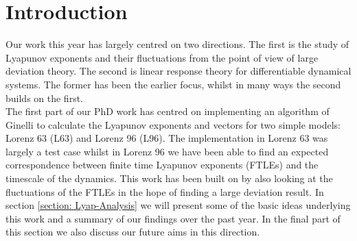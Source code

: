 \section{Introduction}

Our work this year has largely centred on two directions. The first is the study of Lyapunov exponents and their fluctuations from the point of view of large deviation theory. The second is linear response theory for differentiable dynamical systems. The former has been the earlier focus, whilst in many ways the second builds on the first.\\

The first part of our PhD work has centred on implementing an algorithm of Ginelli \cite{Ginelli2013} to calculate the Lyapunov exponents and vectors for two simple models: Lorenz 63 (L63) and Lorenz 96 (L96). The implementation in Lorenz 63 was largely a test case whilst in Lorenz 96 we have been able to find an expected correspondence between finite time Lyapunov exponents (FTLEs) and the timescale of the dynamics. This work has been built on by also looking at the fluctuations of the FTLEs in the hope of finding a large deviation result. In section \ref{section: Lyap-Analysis} we will present some of the basic ideas underlying this work and a summary of our findings over the past year. In the final part of this section we also discuss our future aims in this direction.
